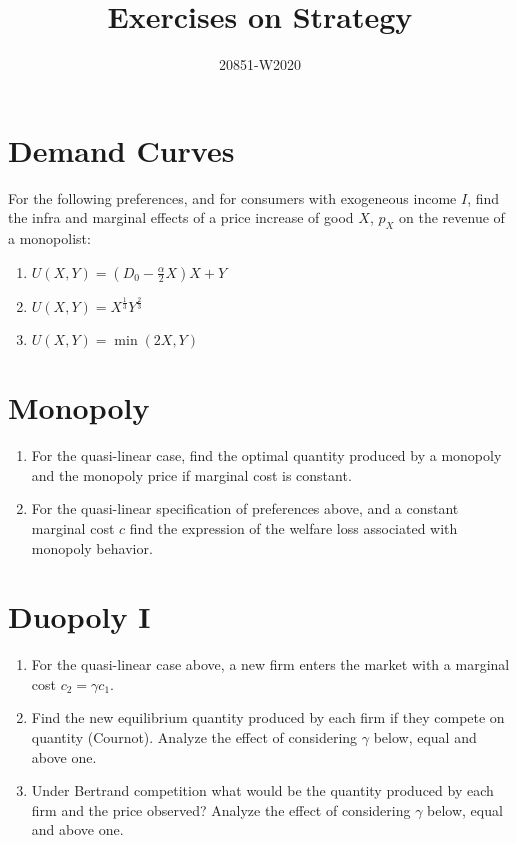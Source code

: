 \documentclass[11pt, oneside,french]{article}   	%
\title{Exercises on Strategy}
\author{20851-W2020}
\date{}							%
\begin{document}
\maketitle

\section{Demand Curves}
For the following preferences, and for consumers with exogeneous income $I$, find the infra and marginal effects of a price increase of good $X$, $p_X$ on the revenue of a monopolist:
\begin{enumerate}
    \item $U(X,Y) = (D_0 - \frac{\alpha}{2}X)X + Y$
    \item $U(X,Y) = X^{\frac{1}{3}}Y^{\frac{2}{3}}$
    \item $U(X,Y) = \min(2X,Y)$
\end{enumerate}

\section{Monopoly}

\begin{enumerate}
    \item For the quasi-linear case, find the optimal quantity produced by a monopoly and the monopoly price if marginal cost is constant. 
    \item For the quasi-linear specification of preferences above, and a constant marginal cost $c$ find the expression of the welfare loss associated with monopoly behavior. 
\end{enumerate}

\section{Duopoly I}

\begin{enumerate}
    \item For the quasi-linear case above, a new firm enters the market with a marginal cost $c_2 = \gamma c_1$.  
    \item Find the new equilibrium quantity produced by each firm if they compete on quantity (Cournot). Analyze the effect of considering $\gamma$ below, equal and above one.  
    \item Under Bertrand competition what would be the quantity produced by each firm and the price observed? Analyze the effect of considering $\gamma$ below, equal and above one.
\end{enumerate}
\end{document}
